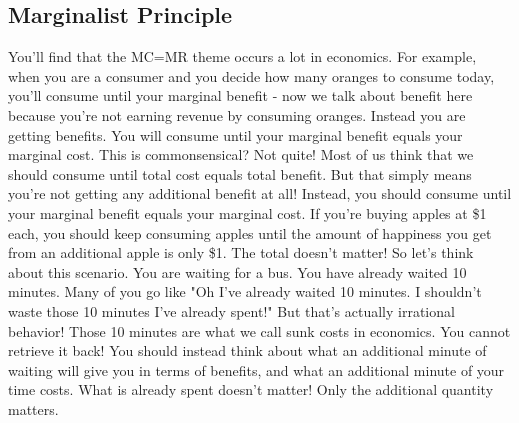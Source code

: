 \subsection{Marginalist Principle}
You'll find that the MC=MR theme occurs a lot in economics. For example, when you are a consumer and you decide how many oranges to consume today, you'll consume until your marginal benefit - now we talk about benefit here because you're not earning revenue by consuming oranges. Instead you are getting benefits. You will consume until your marginal benefit equals your marginal cost. This is commonsensical? Not quite! Most of us think that we should consume until total cost equals total benefit. But that simply means you're not getting any additional benefit at all! Instead, you should consume until your marginal benefit equals your marginal cost. If you're buying apples at \$1 each, you should keep consuming apples until the amount of happiness you get from an additional apple is only \$1. The total doesn't matter! So let's think about this scenario. You are waiting for a bus. You have already waited 10 minutes. Many of you go like "Oh I've already waited 10 minutes. I shouldn't waste those 10 minutes I've already spent!" But that's actually irrational behavior! Those 10 minutes are what we call sunk costs in economics. You cannot retrieve it back! You should instead think about what an additional minute of waiting will give you in terms of benefits, and what an additional minute of your time costs. What is already spent doesn't matter! Only the additional quantity matters.

